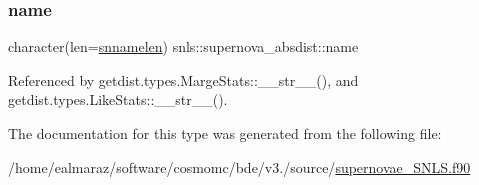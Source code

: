 \mbox{\label{structsnls_1_1supernova__absdist_af3c1b84b2590c58f4888bc142ca12c62}} 
\subsubsection{\texorpdfstring{name}{name}}
{\footnotesize\ttfamily character(len=\mbox{\hyperlink{namespacesnls_a0985d8ccb89aafea09ab6de4c78c5600}{snnamelen}}) snls\+::supernova\+\_\+absdist\+::name\hspace{0.3cm}{\ttfamily [private]}}



Referenced by getdist.\+types.\+Marge\+Stats\+::\+\_\+\+\_\+str\+\_\+\+\_\+(), and getdist.\+types.\+Like\+Stats\+::\+\_\+\+\_\+str\+\_\+\+\_\+().



The documentation for this type was generated from the following file\+:\begin{DoxyCompactItemize}
\item 
/home/ealmaraz/software/cosmomc/bde/v3./source/\mbox{\hyperlink{supernovae__SNLS_8f90}{supernovae\+\_\+\+S\+N\+L\+S.\+f90}}\end{DoxyCompactItemize}
